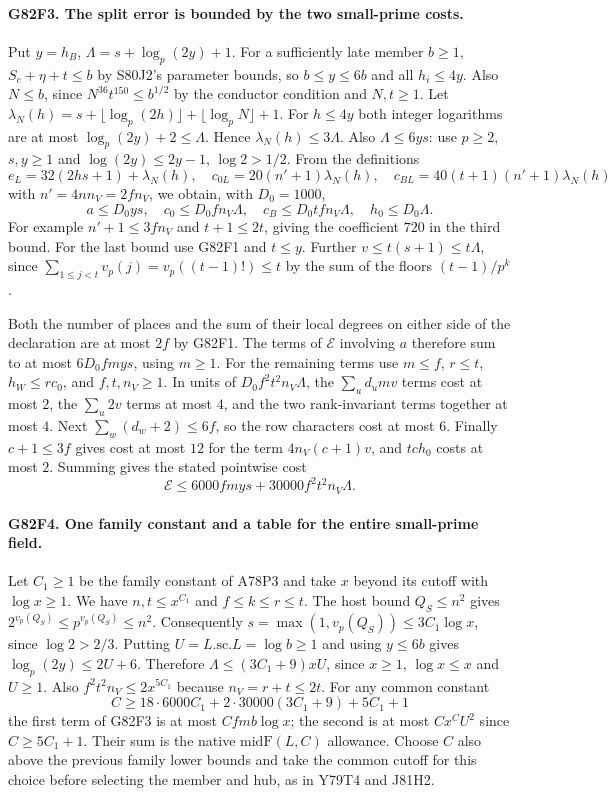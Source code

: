 \paragraph{G82F3. The split error is bounded by the two small-prime costs.}
Put $y=h_B$, $\Lambda=s+\log_p(2y)+1$. For a sufficiently
late member $b\ge1$, $S_c+\eta+t\le b$ by S80J2's parameter
bounds, so $b\le y\le6b$ and all $h_i\le4y$. Also $N\le b$,
since $N^{36}t^{150}\le b^{1/2}$ by the conductor condition
and $N,t\ge1$. Let
$\lambda_N(h)=s+\lfloor\log_p(2h)\rfloor+
\lfloor\log_p N\rfloor+1$.
For $h\le4y$ both integer logarithms are at most
$\log_p(2y)+2\le\Lambda$. Hence $\lambda_N(h)\le3\Lambda$.
Also $\Lambda\le6ys$: use $p\ge2$, $s,y\ge1$ and
$\log(2y)\le2y-1$, $\log2>1/2$. From the definitions
\[
 e_L=32(2hs+1)+\lambda_N(h),\quad
 c_{0L}=20(n'+1)\lambda_N(h),\quad
 c_{BL}=40(t+1)(n'+1)\lambda_N(h)
\]
with $n'=4n n_V=2f n_V$, we obtain, with $D_0=1000$,
\[
  a\le D_0ys,\quad c_0\le D_0 f n_V\Lambda,\quad
  c_B\le D_0 t f n_V\Lambda,\quad h_0\le D_0\Lambda.
\]
For example $n'+1\le3f n_V$ and $t+1\le2t$, giving the
coefficient $720$ in the third bound. For the last bound use
G82F1 and $t\le y$. Further
$v\le t(s+1)\le t\Lambda$, since
$\sum_{1\le j<t}v_p(j)=v_p((t-1)!)\le t$ by the sum of
the floors $(t-1)/p^k$.

Both the number of places and the sum of their local degrees
on either side of the declaration are at most $2f$ by G82F1.
The terms of $\mathcal E$ involving $a$ therefore sum to at
most $6D_0 f m y s$, using $m\ge1$. For the remaining terms
use $m\le f$, $r\le t$, $h_W\le r c_0$,
and $f,t,n_V\ge1$. In units of $D_0 f^2 t^2 n_V\Lambda$,
the $\sum_u d_um v$ terms cost at most $2$, the
$\sum_u 2v$ terms at most $4$, and the two rank-invariant
terms together at most $4$. Next $\sum_w(d_w+2)\le6f$,
so the row characters cost at most $6$. Finally $c+1\le3f$
gives cost at most $12$ for the term $4 n_V(c+1)v$, and
$tc h_0$ costs at most $2$. Summing gives the stated pointwise
cost
\[
      \mathcal E\le 6000 f m y s+30000 f^2t^2 n_V\Lambda .
\]

\paragraph{G82F4. One family constant and a table for the entire small-prime field.}
Let $C_1\ge1$ be the family constant of A78P3 and take $x$
beyond its cutoff with $\log x\ge1$. We have $n,t\le x^{C_1}$
and $f\le k\le r\le t$. The host bound $Q_S\le n^2$ gives
$2^{v_p(Q_S)}\le p^{v_p(Q_S)}\le n^2$. Consequently
$s=\max(1,v_p(Q_S))\le3C_1\log x$, since $\log2>2/3$.
Putting $U=L.\mathrm{sc}.L=\log b\ge1$ and using $y\le6b$
gives $\log_p(2y)\le2U+6$. Therefore
$\Lambda\le(3C_1+9)xU$, since $x\ge1$, $\log x\le x$
and $U\ge1$. Also $f^2t^2 n_V\le2x^{5C_1}$ because
$n_V=r+t\le2t$. For any common constant
\[
 C\ge 18\cdot6000 C_1+2\cdot30000(3C_1+9)+5C_1+1
\]
the first term of G82F3 is at most $C f m b\log x$;
the second is at most $C x^C U^2$ since $C\ge5C_1+1$.
Their sum is the native $\mathrm{midF}(L,C)$ allowance.
Choose $C$ also above the previous family lower bounds and take
the common cutoff for this choice before selecting the member
and hub, as in Y79T4 and J81H2.

